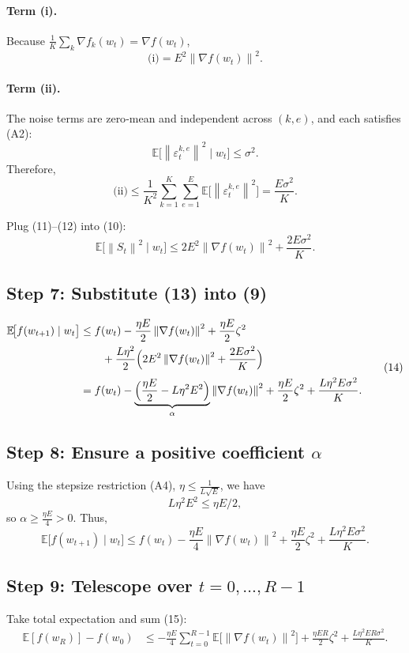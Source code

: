 \documentclass{article}
\newcommand{\EE}{\mathbb{E}}
\newcommand{\norm}[1]{\left\lVert#1\right\rVert}
\begin{document}
\paragraph{Term (i).}
Because $\frac1K\sum_{k}\nabla f_k(w_t)=\nabla f(w_t)$,
\[
\text{(i)} = E^{2}\norm{\nabla f(w_t)}^{2}.
\tag{11}
\]

\paragraph{Term (ii).}
The noise terms are zero‑mean and independent across $(k,e)$, and each satisfies (A2):
\[
\EE\!\bigl[\norm{\varepsilon_{t}^{k,e}}^{2}\mid w_t\bigr]\le\sigma^{2}.
\]
Therefore,
\[
\text{(ii)}\le \frac{1}{K^{2}}\sum_{k=1}^{K}\sum_{e=1}^{E}\EE\!\bigl[\norm{\varepsilon_{t}^{k,e}}^{2}\bigr]
= \frac{E\sigma^{2}}{K}.
\tag{12}
\]

Plug (11)–(12) into (10):
\[
\EE\!\bigl[\norm{S_t}^{2}\mid w_t\bigr]
\le 2E^{2}\norm{\nabla f(w_t)}^{2}+ \frac{2E\sigma^{2}}{K}.
\tag{13}
\]

\subsection*{Step 7: Substitute (13) into (9)}
\[
\begin{aligned}
\EE\!\bigl[f(w_{t+1})\mid w_t\bigr]
&\le f(w_t)
-\frac{\eta E}{2}\norm{\nabla f(w_t)}^{2}
+\frac{\eta E}{2}\zeta^{2}\\
&\qquad
+\frac{L\eta^{2}}{2}\Bigl(2E^{2}\norm{\nabla f(w_t)}^{2}
      +\frac{2E\sigma^{2}}{K}\Bigr)\\[1mm]
&= f(w_t)
-\underbrace{\Bigl(\frac{\eta E}{2}-L\eta^{2}E^{2}\Bigr)}_{\alpha}\norm{\nabla f(w_t)}^{2}
+\frac{\eta E}{2}\zeta^{2}
+ \frac{L\eta^{2}E\sigma^{2}}{K}.
\end{aligned}
\tag{14}
\]

\subsection*{Step 8: Ensure a positive coefficient $\alpha$}
Using the stepsize restriction (A4), $\eta\le\frac{1}{L\sqrt{E}}$, we have
\[
L\eta^{2}E^{2}\le \eta E/2,
\]
so $\alpha\ge \frac{\eta E}{4}>0$.
Thus,
\[
\EE\!\bigl[f(w_{t+1})\mid w_t\bigr]
\le f(w_t)
-\frac{\eta E}{4}\norm{\nabla f(w_t)}^{2}
+\frac{\eta E}{2}\zeta^{2}
+ \frac{L\eta^{2}E\sigma^{2}}{K}.
\tag{15}
\]

\subsection*{Step 9: Telescope over $t=0,\dots ,R-1$}
Take total expectation and sum (15):
\[
\begin{aligned}
\EE[f(w_R)] - f(w_0)
&\le
-\frac{\eta E}{4}\sum_{t=0}^{R-1}\EE\!\bigl[\norm{\nabla f(w_t)}^{2}\bigr]
+ \frac{\eta E R}{2}\zeta^{2}
+ \frac{L\eta^{2}E R\sigma^{2}}{K}.
\end{aligned}
\tag{16}
\]
\end{document}
